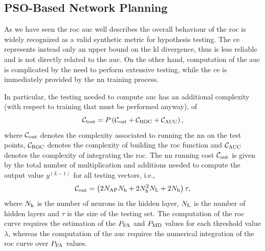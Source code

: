 \documentclass[conference]{IEEEtran}
\begin{document}
\subsection{PSO-Based Network Planning}

As we have seen the \ac{roc} \ac{auc} well describes the overall behaviour of the \ac{roc} is widely recognized as a valid synthetic metric for hypothesis testing. The \ac{ce} represents instead only an upper bound on the \ac{kl} divergence, thus is less reliable and is not directly related to the \ac{auc}. On the other hand, computation of the \ac{auc} is complicated by the need to perform extensive testing, while the \ac{ce} is immediately provided by the \ac{nn} training process. 

In particular, the testing needed to compute \ac{auc} has an additional complexity (with respect to training that must be performed anyway), of 
\begin{equation}
    \mathcal{C}_{\rm test} = P \left( \mathcal{C}_{\rm out}+\mathcal{C}_{\rm ROC}+\mathcal{C}_{\rm AUC}\right),
\end{equation}
where  $\mathcal{C}_{\rm out}$ denotes the complexity associated to running the \ac{nn} on the test points, $\mathcal{C}_{\rm ROC}$ denotes the complexity of building the \ac{roc} function and $\mathcal{C}_{\rm AUC}$ denotes the complexity of integrating the \ac{roc}. The \ac{nn} running cost $\mathcal{C}_{\rm out}$ is given by the total number of multiplication and additions needed to compute the output value $y^{(L-1)}$ for all testing vectors, i.e.,
\begin{equation}
    \mathcal{C}_{\rm out} = \left(2N_{\rm AP}N_{\rm h}+2N_{\rm h}^2N_{\rm L} + 2N_{\rm h}\right)\tau ,
\end{equation}
where $N_{\rm h}$ is the number of neurons in the hidden layer, $N_{\rm L}$ is the number of hidden layers and $\tau$ is the size of the testing set.
The computation of the \ac{roc} curve requires the estimation of the $P_{\rm FA}$ and $P_{\rm MD}$ values for each threshold value $\lambda$, whereas the computation of the \ac{auc} requires the numerical integration of the \ac{roc} curve over $P_{\rm FA}$ values.
\end{document}
